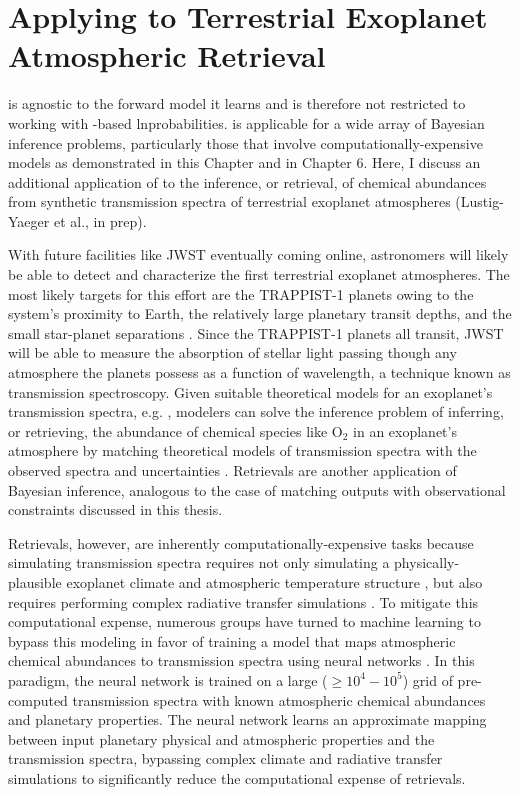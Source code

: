 \section{Applying \approxposterior to Terrestrial Exoplanet Atmospheric Retrieval} \label{AP:sec:future}

\approxposterior is agnostic to the forward model it learns and is therefore not restricted to working with \vplanet-based lnprobabilities. \approxposterior is applicable for a wide array of Bayesian inference problems, particularly those that involve computationally-expensive models as demonstrated in this Chapter and in Chapter 6.  Here, I discuss an additional application of \approxposterior to the inference, or retrieval, of chemical abundances from synthetic transmission spectra of terrestrial exoplanet atmospheres (Lustig-Yaeger et al., in prep).

With future facilities like JWST eventually coming online, astronomers will likely be able to detect and characterize the first terrestrial exoplanet atmospheres. The most likely targets for this effort are the TRAPPIST-1 planets owing to the system's proximity to Earth, the relatively large planetary transit depths, and the small star-planet separations \citep{Gillon2016,Gillon2017,Morley2017,Lustig2019}. Since the TRAPPIST-1 planets all transit, JWST will be able to measure the absorption of stellar light passing though any atmosphere the planets possess as a function of wavelength, a technique known as transmission spectroscopy. Given suitable theoretical models for an exoplanet's transmission spectra, e.g. \citet{Lincowski2018}, modelers can solve the inference problem of inferring, or retrieving, the abundance of chemical species like O$_2$ in an exoplanet's atmosphere by matching theoretical models of transmission spectra with the observed spectra and uncertainties \citep[e.g.][]{KrissansenTotton2018,Tremblay2020}. Retrievals are another application of Bayesian inference, analogous to the case of matching \vplanet outputs with observational constraints discussed in this thesis.

Retrievals, however, are inherently computationally-expensive tasks because simulating transmission spectra requires not only simulating a physically-plausible exoplanet climate and atmospheric temperature structure \citep{Lincowski2018}, but also requires performing complex radiative transfer simulations \citep[e.g. with SMART, ][]{Meadows1996,Crisp1997}. To mitigate this computational expense, numerous groups have turned to machine learning to bypass this modeling in favor of training a model that maps atmospheric chemical abundances to transmission spectra using neural networks \citep{Waldmann2016,MarquezNeila2018,Zingales2018,Cobb2019,Fisher2019,Himes2020}. In this paradigm, the neural network is trained on a large ($\geq 10^4-10^5$) grid of pre-computed transmission spectra with known atmospheric chemical abundances and planetary properties. The neural network learns an approximate mapping between input planetary physical and atmospheric properties and the transmission spectra, bypassing complex climate and radiative transfer simulations to significantly reduce the computational expense of retrievals.

